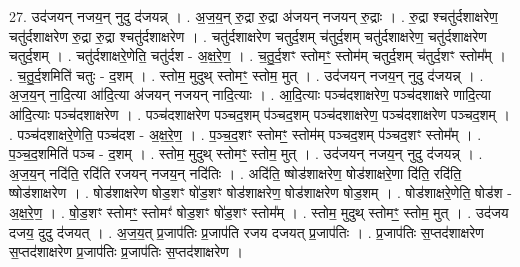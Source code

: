 \documentclass[17pt]{extarticle}
\begin{document}
27. उद॑जयन् नजय॒न् नुदु द॑जयन्न् । . अ॒ज॒य॒न् रु॒द्रा रु॒द्रा अ॑जयन् नजयन् रु॒द्राः । . रु॒द्रा श्चतु॑र्दशाक्षरेण॒ चतु॑र्दशाक्षरेण रु॒द्रा रु॒द्रा श्चतु॑र्दशाक्षरेण । . चतु॑र्दशाक्षरेण चतुर्द॒शम् च॑तुर्द॒शम् चतु॑र्दशाक्षरेण॒ चतु॑र्दशाक्षरेण चतुर्द॒शम् । . चतु॑र्दशाक्षरे॒णेति॒ चतु॑र्दश - अ॒क्ष॒रे॒ण॒ । . च॒तु॒र्द॒शꣳ स्तोमꣳ॒॒ स्तोम॑म् चतुर्द॒शम् च॑तुर्द॒शꣳ स्तोम᳚म् । . च॒तु॒र्द॒शमिति॑ चतुः - द॒शम् । . स्तोम॒ मुदुथ् स्तोमꣳ॒॒ स्तोम॒ मुत् । . उद॑जयन् नजय॒न् नुदु द॑जयन्न् । . अ॒ज॒य॒न् ना॒दि॒त्या आ॑दि॒त्या अ॑जयन् नजयन् नादि॒त्याः । . आ॒दि॒त्याः पञ्च॑दशाक्षरेण॒ पञ्च॑दशाक्षरे णादि॒त्या आ॑दि॒त्याः पञ्च॑दशाक्षरेण । . पञ्च॑दशाक्षरेण पञ्चद॒शम् प॑ञ्चद॒शम् पञ्च॑दशाक्षरेण॒ पञ्च॑दशाक्षरेण पञ्चद॒शम् । . पञ्च॑दशाक्षरे॒णेति॒ पञ्च॑दश - अ॒क्ष॒रे॒ण॒ । . प॒ञ्च॒द॒शꣳ स्तोमꣳ॒॒ स्तोम॑म् पञ्चद॒शम् प॑ञ्चद॒शꣳ स्तोम᳚म् । . प॒ञ्च॒द॒शमिति॑ पञ्च - द॒शम् । . स्तोम॒ मुदुथ् स्तोमꣳ॒॒ स्तोम॒ मुत् । . उद॑जयन् नजय॒न् नुदु द॑जयन्न् । . अ॒ज॒य॒न् नदि॑ति॒ रदि॑ति रजयन् नजय॒न् नदि॑तिः । . अदि॑ति॒ ष्षोड॑शाक्षरेण॒ षोड॑शाक्षरे॒णा दि॑ति॒ रदि॑ति॒ ष्षोड॑शाक्षरेण । . षोड॑शाक्षरेण षोड॒शꣳ षो॑ड॒शꣳ षोड॑शाक्षरेण॒ षोड॑शाक्षरेण षोड॒शम् । . षोड॑शाक्षरे॒णेति॒ षोड॑श - अ॒क्ष॒रे॒ण॒ । . षो॒ड॒शꣳ स्तोमꣳ॒॒ स्तोमꣳ॑ षोड॒शꣳ षो॑ड॒शꣳ स्तोम᳚म् । . स्तोम॒ मुदुथ् स्तोमꣳ॒॒ स्तोम॒ मुत् । . उद॑जय दजय॒ दुदु द॑जयत् । . अ॒ज॒य॒त् प्र॒जाप॑तिः प्र॒जाप॑ति रजय दजयत् प्र॒जाप॑तिः । . प्र॒जाप॑तिः स॒प्तद॑शाक्षरेण स॒प्तद॑शाक्षरेण प्र॒जाप॑तिः प्र॒जाप॑तिः स॒प्तद॑शाक्षरेण । \newline
\end{document}

